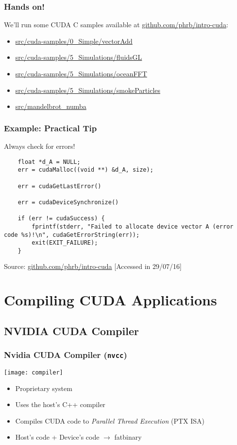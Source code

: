 \documentclass[10pt, compress]{beamer}
\begin{document}
\begin{frame}
    \frametitle{Hands on!}
    We'll run some CUDA C samples available at
    \url{github.com/phrb/intro-cuda}:
    \begin{itemize}
        \item \url{src/cuda-samples/0_Simple/vectorAdd}
        \item \url{src/cuda-samples/5_Simulations/fluidsGL}
        \item \url{src/cuda-samples/5_Simulations/oceanFFT}
        \item \url{src/cuda-samples/5_Simulations/smokeParticles}
        \item \url{src/mandelbrot_numba}
    \end{itemize}
\end{frame}

\begin{frame}[fragile]
    \frametitle{Example: Practical Tip}
    \alert{Always} check for errors!

    \begin{lstlisting}
    float *d_A = NULL;
    err = cudaMalloc((void **) &d_A, size);

    err = cudaGetLastError()

    err = cudaDeviceSynchronize()

    if (err != cudaSuccess) {
        fprintf(stderr, "Failed to allocate device vector A (error code %s)!\n", cudaGetErrorString(err));
        exit(EXIT_FAILURE);
    }
    \end{lstlisting}

    \begin{center}
        \tiny{Source: \url{github.com/phrb/intro-cuda} [Accessed in 29/07/16]}
    \end{center}
\end{frame}

\section{Compiling CUDA Applications}

\subsection{NVIDIA CUDA Compiler}

\begin{frame}
    \frametitle{Nvidia CUDA Compiler (\texttt{nvcc})}
    \begin{center}
        \texttt{[image: compiler]}
    \end{center}
    \pause
    \begin{itemize}
        \item \alert{Proprietary} system
            \pause
        \item Uses the host's C++ compiler
            \pause
        \item Compiles CUDA code to \textit{Parallel Thread Execution} (\alert{PTX} ISA)
            \pause
        \item Host's code + Device's code $\rightarrow$ \alert{fatbinary}
    \end{itemize}
\end{frame}
\end{document}
